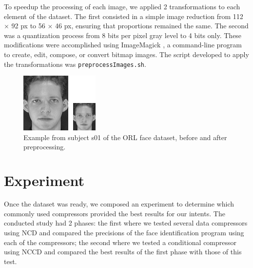 \documentclass[12pt]{article}
\begin{document}
To speedup the processing of each image, we applied 2 transformations to each element of the dataset.
The first consisted in a simple image reduction from 112 $\times$ 92 px to 56 $\times$ 46 px, ensuring that proportions remained the same.
The second was a quantization process from 8 bits per pixel gray level to 4 bits only.
These modifications were accomplished using ImageMagick \cite{imgmagick}, a command-line program to create, edit, compose, or convert bitmap images.
The script developed to apply the transformations was \texttt{preprocessImages.sh}.

\begin{figure}[H]
  \centering
  \begin{minipage}{.2\textwidth}
    \centering
    \includegraphics[width=\linewidth]{preprocessing_example.png}
  \end{minipage}%
  \caption{Example from subject s01 of the ORL face dataset, before and after preprocessing.}
  \label{fig:2}
\end{figure}

\newpage
\section{Experiment} %

Once the dataset was ready, we composed an experiment to determine which commonly used compressors provided the best results for our intents.
The conducted study had 2 phases: the first where we tested several data compressors using NCD and compared the precisions of the face identification 
program using each of the compressors; the second where we tested a conditional compressor using NCCD and compared the best results of the first phase with 
those of this test.
\end{document}
